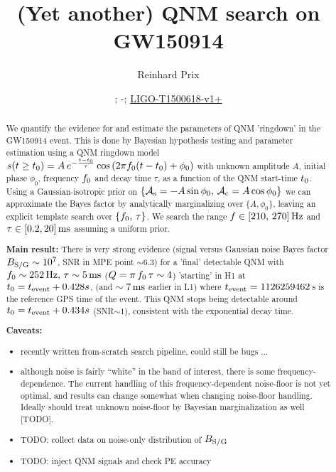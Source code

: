 \documentclass[aps,prd,onecolumn,notitlepage,nofootinbib,superscriptaddress,altaffilletter,floatfix]{revtex4-1}
\newcommand{\dcc}{LIGO-T1500618-v1+}
\begin{document}
\title{(Yet another) QNM search on GW150914}


\author{Reinhard Prix}
\date{\commitDATE; \commitIDshort-\commitSTATUS; \href{https://dcc.ligo.org/LIGO-T1500618}{\dcc}}


\begin{abstract}
  We quantify the evidence for and estimate the parameters of QNM 'ringdown' in the GW150914 event.
  This is done by Bayesian hypothesis testing and parameter estimation using a QNM ringdown model
  $s(t\ge t_0) = A\,e^{-\frac{t-t_0}{\tau}}\cos\left(2\pi f_0 (t-t_0) + \phi_0\right)$ with unknown amplitude $A$, initial phase $\phi_0$,
  frequency $f_0$ and decay time $\tau$, as a function of the QNM start-time $t_0$.
  Using a Gaussian-isotropic prior on $\{\mathcal{A}_{\mathrm{s}}=-A\sin\phi_0,\,\mathcal{A}_{\mathrm{c}}=A\cos\phi_0\}$ we can approximate the Bayes factor by analytically marginalizing over
  $\{A,\phi_0\}$, leaving an explicit template search over $\{f_0,\,\tau\}$. We search the range $f\in[210,\,270]\,\mathrm{Hz}$ and $\tau \in [0.2, 20]\,\mathrm{ms}$
  assuming a uniform prior.

  \textbf{Main result:}
  There is very strong evidence (signal versus Gaussian noise Bayes factor $B_{\mathrm{S/G}}\sim10^{7}$, SNR in MPE point $\sim6.3$) for a 'final' detectable QNM
  with $f_0\sim252\,\mathrm{Hz},\,\tau\sim5\,\mathrm{ms}$ ($Q = \pi\,f_0\,\tau \sim 4$) 'starting' in H1 at $t_0 = t_{\mathrm{event}} + 0.428s$, (and $\sim7\,\mathrm{ms}$ earlier in L1)
  where $t_{\mathrm{event}} = 1126259462\,$s is the reference GPS time of the event.
  This QNM stops being detectable around $t_0 = t_{\mathrm{event}}+0.434s$ (SNR$\sim1$), consistent with the exponential decay time.

  \textbf{Caveats:}
  \begin{itemize}
  \item recently written from-scratch search pipeline, could still be bugs ...
  \item although noise is fairly ``white'' in the band of interest, there is some frequency-dependence. The current handling of this
    frequency-dependent noise-floor is not yet optimal, and results can change somewhat when changing noise-floor handling.
    Ideally should treat unknown noise-floor by Bayesian marginalization as well [TODO].
  \item TODO: collect data on noise-only distribution of $B_{\mathrm{S/G}}$
  \item TODO: inject QNM signals and check PE accuracy
  \end{itemize}
\end{abstract}
\end{document}
